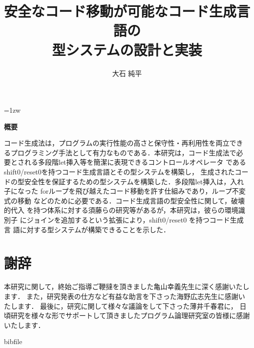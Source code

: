 \documentclass[a4paper,11pt]{jreport}
\title{安全なコード移動が可能なコード生成言語の\\型システムの設計と実装}
\author{大石 純平}
\begin{document}
\maketitle
\thispagestyle{empty}
\newpage

\thispagestyle{empty}
\vspace*{20pt plus 1fil}
\parindent=1zw
\noindent
\begin{center}
  {\bf 概要}
  \vspace{5mm}
\end{center}
コード生成法は，プログラムの実行性能の高さと保守性・再利用性を両立でき
るプログラミング手法として有力なものである．本研究は，コード生成法で必
要とされる多段階let挿入等を簡潔に表現できるコントロールオペレータ
である shift0/reset0を持つコード生成言語とその型システムを構築し，
生成されたコードの型安全性を保証するための型システムを構築した．多段階let挿入は，入れ子になった
forループを飛び越えたコード移動を許す仕組みであり，ループ不変式の移動
などのために必要である．コード生成言語の型安全性に関して，破壊的代入
を持つ体系に対する須藤らの研究等があるが，本研究は，彼らの環境識別子
にジョインを追加するという拡張により，shift0/reset0 を持つコード生成言
語に対する型システムが構築できることを示した．

\par
\vspace{0pt plus 1fil}
\newpage

\tableofcontents
\listoffigures

\pagebreak \setcounter{page}{1}







% 
% 


\chapter*{謝辞}
本研究に関して，終始ご指導ご鞭撻を頂きました亀山幸義先生に深く感謝いたします．
また，研究発表の仕方など有益な助言を下さった海野広志先生に感謝いたします．
最後に，研究に関して様々な議論をして下さった薄井千春君に，
日頃研究を様々な形でサポートして頂きましたプログラム論理研究室の皆様に感謝いたします．
\newpage

\renewcommand{\bibname}{参考文献}

\nocite{*}
 {bibfile}

% 
\end{document}
